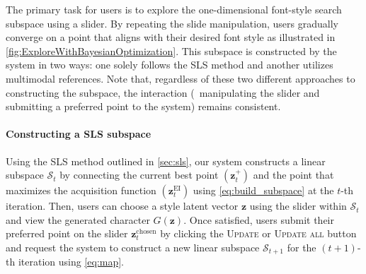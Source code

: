 The primary task for users is to explore the one-dimensional font-style search subspace using a slider.
By repeating the slide manipulation, users gradually converge on a point that aligns with their desired font style as illustrated in \autoref{fig:ExploreWithBayesianOptimization}.
This subspace is constructed by the system in two ways:
one solely follows the SLS method and another utilizes multimodal references.
Note that, regardless of these two different approaches to constructing the subspace, the interaction (\ie~manipulating the slider and submitting a preferred point to the system) remains consistent.

\paragraph{Constructing a SLS subspace}
Using the SLS method outlined in \autoref{sec:sls}, our system constructs a linear subspace $\mathcal{S}_{t}$ by connecting the current best point $(\bm{z}^+_t)$ and the point that maximizes the acquisition function $(\bm{z}^\text{EI}_t)$ using \autoref{eq:build_subspace} at the $t$-th iteration.
Then, users can choose a style latent vector $\bm{z}$ using the slider within $\mathcal{S}_{t}$ and view the generated character $G(\bm{z})$.
Once satisfied, users submit their preferred point on the slider $\bm{z}^{\text{chosen}}_t$ by clicking the \textsc{Update} or \textsc{Update all} button and request the system to construct a new linear subspace $\mathcal{S}_{t+1}$ for the $(t+1)$-th iteration using \autoref{eq:map}.


